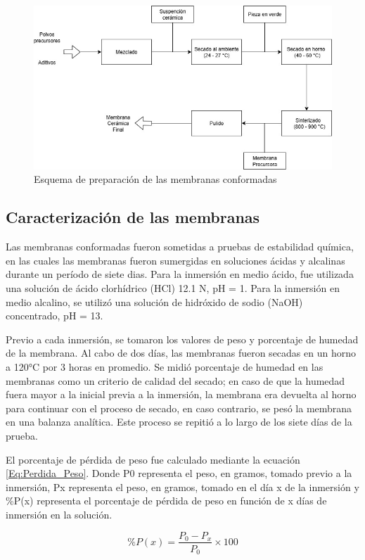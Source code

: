 \documentclass{article}
\begin{document}
\begin{figure}[!htbp]
    \centering
    \includegraphics[width=0.7\linewidth]{Esquema de preparacion de membranas ceramicas.jpg}
    \caption{Esquema de preparación de las membranas conformadas}
    \label{fig:Esq_PrepMembranas}
\end{figure}

\subsection{Caracterización de las membranas}

Las membranas conformadas fueron sometidas a pruebas de estabilidad 
química, en las cuales las membranas fueron sumergidas en soluciones 
ácidas y alcalinas durante un período de siete dias. Para la inmersión 
en medio ácido, fue utilizada una solución de ácido clorhídrico 
(HCl) 12.1 N, pH = 1. Para la inmersión en medio alcalino, se utilizó 
una solución de hidróxido de sodio (NaOH) concentrado, pH = 13. 

Previo a cada inmersión, se tomaron los valores de peso y porcentaje 
de humedad de la membrana. Al cabo de dos días, las membranas fueron 
secadas en un horno a 120°C por 3 horas en promedio. 
Se midió porcentaje de humedad en las membranas como un criterio de 
calidad del secado; en caso de que la humedad fuera mayor a la 
inicial previa a la inmersión, la membrana era devuelta al horno 
para continuar con el proceso de secado, en caso contrario, se pesó 
la membrana en una balanza analítica. Este proceso se repitió a lo 
largo de los siete días de la prueba. 

El porcentaje de pérdida de peso fue calculado mediante la 
ecuación \ref{Eq:Perdida_Peso}. Donde P0 representa el peso, 
en gramos, tomado previo a la inmersión, Px representa el peso, 
en gramos, tomado en el día x de la inmersión y \%P(x) representa 
el porcentaje de pérdida de peso en función de x días de inmersión 
en la solución.   

\begin{equation}
    \%P(x) = \frac{P_0-P_x}{P_0} \times 100
    \label{Eq:Perdida_Peso}
\end{equation}
\end{document}
